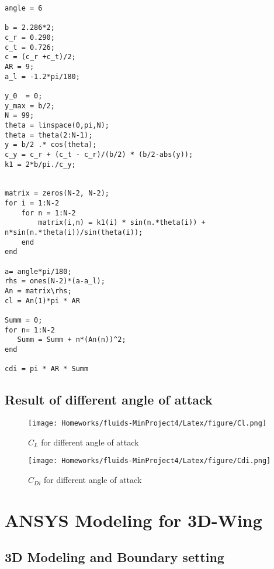 \documentclass[12pt]{article}
\begin{document}
\begin{lstlisting}[caption={A function for SD},label={lst:script1}]
angle = 6

b = 2.286*2;
c_r = 0.290;
c_t = 0.726;
c = (c_r +c_t)/2;
AR = 9;
a_l = -1.2*pi/180;

y_0  = 0;
y_max = b/2;
N = 99;
theta = linspace(0,pi,N);
theta = theta(2:N-1);
y = b/2 .* cos(theta);
c_y = c_r + (c_t - c_r)/(b/2) * (b/2-abs(y));
k1 = 2*b/pi./c_y;


matrix = zeros(N-2, N-2);
for i = 1:N-2
    for n = 1:N-2
        matrix(i,n) = k1(i) * sin(n.*theta(i)) + n*sin(n.*theta(i))/sin(theta(i));
    end
end

a= angle*pi/180;
rhs = ones(N-2)*(a-a_l);
An = matrix\rhs;
cl = An(1)*pi * AR

Summ = 0;
for n= 1:N-2
   Summ = Summ + n*(An(n))^2;
end

cdi = pi * AR * Summ
\end{lstlisting}









\subsection{Result of different angle of attack}


\begin{figure}[H]
    \centering
    \texttt{[image: Homeworks/fluids-MinProject4/Latex/figure/Cl.png]}
    \label{IGs.jpg}
    \caption{$C_L$ for different angle of attack}
\end{figure}

\begin{figure}[H]
    \centering
    \texttt{[image: Homeworks/fluids-MinProject4/Latex/figure/Cdi.png]}
    \label{IGs.jpg}
    \caption{$C_{Di}$ for different angle of attack}
\end{figure}


\section{ANSYS Modeling for 3D-Wing}


\subsection{3D Modeling and Boundary setting}
\end{document}
